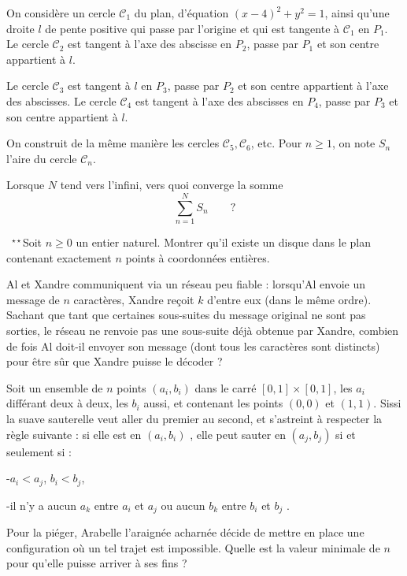 \begin{exo}{}
On considère un cercle $ \mathcal{C}_{1}$ du plan, d'équation $(x-4)^{2}+y^{2}=1$, ainsi qu'une droite $l$ de pente positive qui passe par l'origine et qui est tangente à $ \mathcal{C}_{1}$ en $P_{1}$. Le cercle $ \mathcal{C}_{2}$ est tangent à l'axe des abscisse en $P_{2}$, passe par $P_{1}$ et son centre appartient à $l$.

\smallskip

Le cercle $ \mathcal{C}_{3}$ est tangent à $l$ en $P_{3}$, passe par $P_{2}$ et son centre appartient à l'axe des abscisses. Le cercle $ \mathcal{C}_{4}$ est tangent à l'axe des abscisses en $P_{4}$, passe par $P_{3}$ et son centre appartient à $l$.

\smallskip

On construit de la même manière les cercles $ \mathcal{C}_{5}, \mathcal{C}_{6}$, etc. Pour $n \geq 1$, on note $S_{n}$ l'aire du cercle $ \mathcal{C}_{n}$.

\smallskip
Lorsque $N$ tend vers l'infini, vers quoi converge la somme
$$ \sum_{n=1}^{N} S_{n} \qquad ?$$
\end{exo}


\begin{exo}{ \mbox{ }$^ {\star \star}$}Soit $n\geq 0$ un entier naturel. Montrer qu'il existe un disque dans le plan contenant exactement $n$ points à coordonnées entières.
\end{exo}

\begin{exo}{}Al et Xandre communiquent via un réseau peu fiable : lorsqu’Al envoie un message de $n$ caractères,
Xandre reçoit $k$ d’entre eux (dans le même ordre). Sachant que tant que certaines
sous-suites du message original ne sont pas sorties, le réseau ne renvoie pas une sous-suite déjà
obtenue par Xandre, combien de fois Al doit-il envoyer son message (dont tous les caractères sont
distincts) pour être sûr que Xandre puisse le décoder ?
\end{exo}

\begin{exo}{}
Soit un ensemble de $n$ points $(a_{i}, b_{i})$ dans le carré $[0, 1] \times  [0, 1]$, les $a_{i}$ différant deux à deux, les
$b_{i}$ aussi, et contenant les points $(0,0)$ et $(1, 1)$. Sissi la suave sauterelle veut aller du premier au
second, et s’astreint à respecter la règle suivante : si elle est en $(a_{i}, b_{i})$ , elle peut sauter en $(a_{j}, b_{j})$ si et seulement si :

-$a_{i} < a_{j}$, $b_{i} < b_{j}$,

-il n’y a aucun $a_{k}$ entre $a_{i}$ et $a_{j}$ ou aucun $b_{k}$ entre $b_{i}$ et $b_{j}$ .

\bigskip

Pour la piéger, Arabelle l’araignée acharnée décide de mettre en place une configuration où un
tel trajet est impossible. Quelle est la valeur minimale de $n$ pour qu’elle puisse arriver à ses fins
?
\end{exo}

